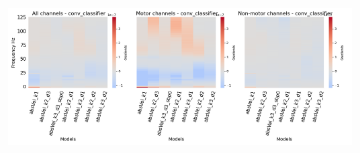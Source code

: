 \begin{figure}[!htpb]
\begin{subfigure}[b]{\textwidth}
   \includegraphics[width=1\linewidth]{img/appendix/D/conv-classifier/m/absVel_model_gradients_all_kinds}
   \caption{}
   \label{fig:absVel-pw-full-grads-conv-classifier}
\end{subfigure}

\caption[]{}
\label{fig:absVel-pw-full-grads}
\end{figure}
